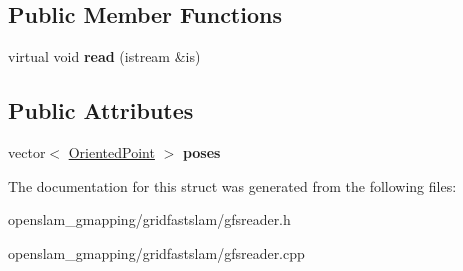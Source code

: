 \subsection*{Public Member Functions}
\begin{DoxyCompactItemize}
\item 
\mbox{\label{structGMapping_1_1GFSReader_1_1OdometryRecord_a5afbe391c233ca2a55772b107624926d}} 
virtual void {\bfseries read} (istream \&is)
\end{DoxyCompactItemize}
\subsection*{Public Attributes}
\begin{DoxyCompactItemize}
\item 
\mbox{\label{structGMapping_1_1GFSReader_1_1OdometryRecord_a44fb7b890d5c03d953e13ed6a0ade04c}} 
vector$<$ \hyperlink{structGMapping_1_1orientedpoint}{Oriented\+Point} $>$ {\bfseries poses}
\end{DoxyCompactItemize}


The documentation for this struct was generated from the following files\+:\begin{DoxyCompactItemize}
\item 
openslam\+\_\+gmapping/gridfastslam/gfsreader.\+h\item 
openslam\+\_\+gmapping/gridfastslam/gfsreader.\+cpp\end{DoxyCompactItemize}
